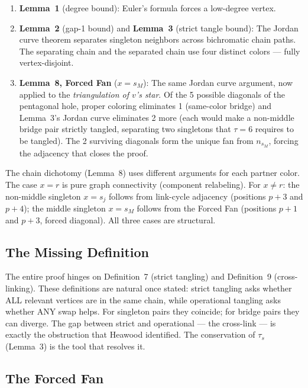 \documentclass[11pt]{article}
\theoremstyle{remark}
\begin{document}
\begin{enumerate}[label=\arabic*.]
  \item \textbf{Lemma~1} (degree bound): Euler's formula forces a low-degree vertex.
  \item \textbf{Lemma~2} (gap-1 bound) and \textbf{Lemma~3} (strict tangle bound): The Jordan curve theorem separates singleton neighbors across bichromatic chain paths. The separating chain and the separated chain use four distinct colors --- fully vertex-disjoint.
  \item \textbf{Lemma~8, Forced Fan} ($x = s_M$): The same Jordan curve argument, now applied to the \emph{triangulation of $v$'s star}. Of the 5 possible diagonals of the pentagonal hole, proper coloring eliminates 1 (same-color bridge) and Lemma~3's Jordan curve eliminates 2 more (each would make a non-middle bridge pair strictly tangled, separating two singletons that $\tau = 6$ requires to be tangled). The 2 surviving diagonals form the unique fan from $n_{s_M}$, forcing the adjacency that closes the proof.
\end{enumerate}

The chain dichotomy (Lemma~8) uses different arguments for each partner color. The case $x = r$ is pure graph connectivity (component relabeling). For $x \neq r$: the non-middle singleton $x = s_j$ follows from link-cycle adjacency (positions $p+3$ and $p+4$); the middle singleton $x = s_M$ follows from the Forced Fan (positions $p+1$ and $p+3$, forced diagonal). All three cases are structural.

\subsection{The Missing Definition}

The entire proof hinges on Definition~7 (strict tangling) and Definition~9 (cross-linking). These definitions are natural once stated: strict tangling asks whether ALL relevant vertices are in the same chain, while operational tangling asks whether ANY swap helps. For singleton pairs they coincide; for bridge pairs they can diverge. The gap between strict and operational --- the cross-link --- is exactly the obstruction that Heawood identified. The conservation of $\tau_s$ (Lemma~3) is the tool that resolves it.

\subsection{The Forced Fan}
\end{document}
